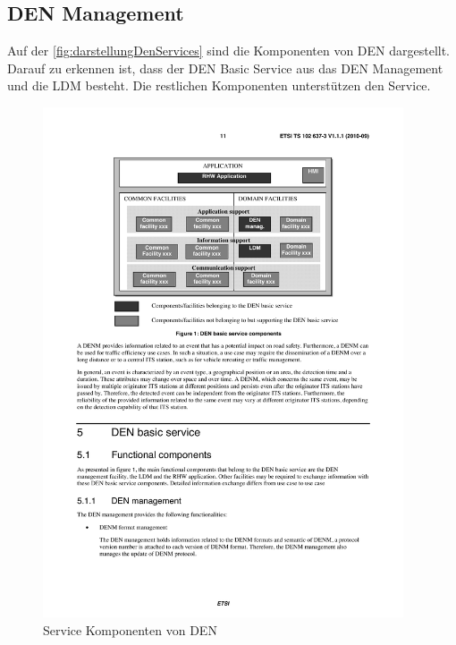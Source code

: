 \subsection{DEN Management}
Auf der \autoref{fig:darstellungDenServices} sind die Komponenten von \ac{DEN} dargestellt. Darauf zu erkennen ist, dass der \ac{DEN} Basic Service aus das \ac{DEN} Management und die \ac{LDM} besteht. Die restlichen Komponenten unterstützen den Service. 

\begin{figure}[htbp]
	\includegraphics[width=0.95\textwidth]{content/images/04_facilitylayer/denServices.pdf}
	\caption{Service Komponenten von DEN \cite{ts102637-3}}
	\label{fig:darstellungDenServices}
\end{figure}


